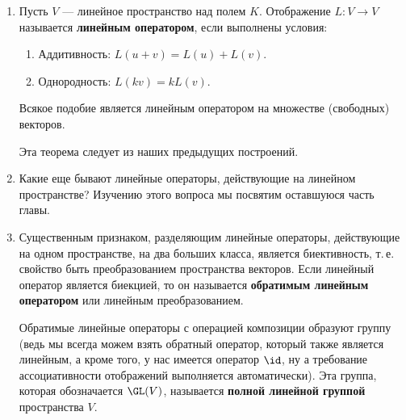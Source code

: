 
\begin{enumerate}
\item Пусть $V$ --- линейное пространство над полем $K$.
Отображение $L:V\to V$ называется \textbf{линейным оператором}, если выполнены условия:
\begin{enumerate}[{\bf Lin}1]
\item Аддитивность: $L(u+v)=L(u)+L(v)$.
\item Однородность: $L(kv)=kL(v)$.
\end{enumerate}

\begin{thrm}
Всякое подобие является линейным оператором на множестве (свободных) векторов.
\end{thrm}
Эта теорема следует из наших предыдущих построений.

\item Какие еще бывают линейные операторы, действующие на линейном пространстве? Изучению этого вопроса мы посвятим оставшуюся часть главы.
\item Существенным признаком, разделяющим линейные операторы, действующие на одном пространстве, на два больших класса, является биективность, т.\,е. свойство быть преобразованием пространства векторов. Если линейный оператор является биекцией, то он называется \textbf{обратимым линейным оператором} или линейным преобразованием.

Обратимые линейные операторы с операцией композиции образуют группу (ведь мы всегда можем взять обратный оператор, который также является линейным, а кроме того, у нас имеется оператор $\id$, ну а требование ассоциативности отображений выполняется автоматически). Эта группа, которая обозначается $\GL(V)$, называется \textbf{полной линейной группой} пространства $V$.


\end{enumerate}
